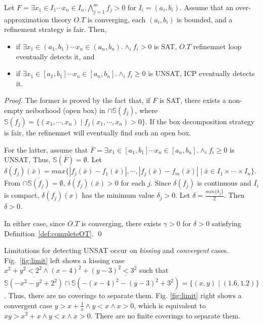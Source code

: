 \documentclass[runningheads,a4paper,oribibl]{llncs}
\begin{document}
\begin{theorem} \label{th:RelComp}
Let
$F = \exists x_1 \in I_1 \cdots x_n \in I_n. \bigwedge \limits_{j=1}^m f_j > 0$
for $I_i = (a_i,b_i)$.
Assume that an over-approximation theory $O.T$ is converging, 
each $(a_i,b_i)$ is bounded, and a refinement strategy is fair. 
Then, 
\begin{itemize}
\item if $\exists x_1 \in (a_1,b_1) \cdots x_n \in (a_n,b_n) . \wedge_{i} f_i > 0$ is SAT, 
$O.T$ refinemnet loop eventually detects it, and
\item if $\exists x_1 \in [a_1,b_1] \cdots x_n \in [a_n,b_n] . \wedge_{i} f_i \geq 0$ is UNSAT, 
ICP eventually detects it.  
\end{itemize}
\end{theorem}


\begin{proof} 
The former is proved by the fact that, if $F$ is SAT, there exists a non-empty neiborhood (open box) 
in $\cap \mathbb{S}(f_j)$, where $\mathbb{S}(f_j) = \{ (x_1, \cdots, x_n) \mid f_j(x_1, \cdots, x_n) > 0 \}$. 
If the box decomposition strategy is fair, the refinemnet will eventually find such an open box. 

For the latter, assume that 
$\overline{F} = \exists x_1 \in [a_1,b_1] \cdots x_n \in [a_n,b_n] . \wedge_{i} f_i \geq 0$ is UNSAT, 
Thus, $\mathbb{S}(\overline{F}) = \emptyset$. 
Let $\delta(f_j)(\bar{x}) = max \{ |f_j(\bar{x}) - f_1(\bar{x})|, \cdots, 
|f_j(\bar{x}) - f_m(\bar{x})| \mid \bar{x} \in I_1 \times \cdots \times I_n\}$. 
From $\cap \overline{\mathbb{S}(f_j)} = \emptyset$, $\delta(f_j)(\bar{x}) > 0$ 
for each $j$. 
Since $\delta(f_j)$ is continuous and $\overline{I_i}$ is compact, 
$\delta(f_j)(x)$ has the minimum value $\delta_j > 0$. 
Let 
$\delta = \frac{min \{ \delta_j \}}{2}$. Then $\delta > 0$. 

In either case, since $O.T$ is converging, there exists $\gamma > 0$ for $\delta > 0$ 
satisfying Definition~\ref{def:completeOT}. 
\qed
\end{proof}

Limitations for detecting UNSAT occur on \emph{kissing} and \emph{convergent} cases. 
Fig.~\ref{fig:limit} left shows a kissing case 
$x^2 + y^2 < 2^2 \wedge (x-4)^2 + (y-3)^2 < 3^2$ such that 
$\overline{\mathbb{S}(- x^2 - y^2 + 2^2)} \cap \overline{\mathbb{S}(- (x-4)^2 - (y-3)^2 + 3^2)} 
= \{(x,y) \mid (1.6, 1.2)\}$. 
Thus, there are no coverings to separate them. 
%
Fig. \ref{fig:limit} right shows a convergent case 
$y > x + \frac{1}{x} \wedge y < x \wedge x > 0$, which is equivalent to 
$xy > x^2 + x \wedge y < x \wedge x > 0$. 
There are no finite coverings to separate them. 
\end{document}

